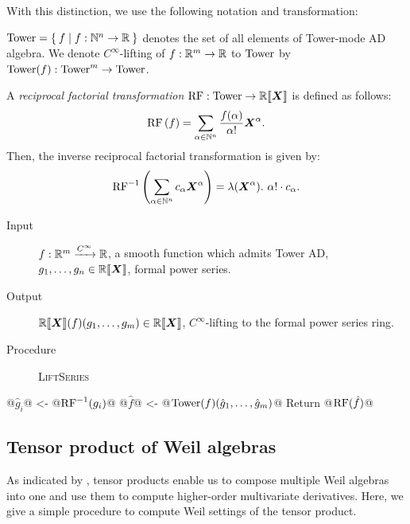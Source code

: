 With this distinction, we use the following notation and transformation:

\begin{definition}
  $\mathord{\mathrm{Tower}} = \Set{f | f: \mathbb{N}^n \to \mathbb{R}}$ denotes the set of all elements of Tower-mode AD algebra.
  We denote $C^\infty$-lifting of $f: \mathbb{R}^m \to \mathbb{R}$ to $\mathord{\mathrm{Tower}}$ by $\mathord{\mathrm{Tower}}(f): \mathord{\mathrm{Tower}}^m \to \mathord{\mathrm{Tower}}$.

  A \emph{reciprocal factorial transformation} $\operatorname{RF}: \mathord{\mathrm{Tower}} \to \mathord{\mathbb{R}\llbracket\boldsymbol{X}\rrbracket}$ is defined as follows:
  \[
    \operatorname{RF}\left(f\right)
    = \sum_{\alpha \in \mathbb{N}^n} \frac{f(\alpha)}{\alpha!} \boldsymbol{X}^\alpha.
  \]
  Then, the inverse reciprocal factorial transformation is given by:
  \[
  \operatorname{RF}^{-1}\left(\sum_{\alpha \in \mathbb{N}^n} c_\alpha \boldsymbol{X}^\alpha\right)
  = \lambda (\boldsymbol{X}^\alpha).\ \alpha ! \cdot c_\alpha.
  \]
\end{definition}

\begin{algorithm}\label{lift-series}
\hfill\vspace{-.25em}
\begin{description}
  \item[Input]
    $f: \mathbb{R}^m \xrightarrow{C^\infty} \mathbb{R}$, a smooth function which admits Tower AD,
    $g_1, \dots, g_n \in \mathord{\mathbb{R}\llbracket\boldsymbol{X}\rrbracket}$, formal power series.
  \item[Output] $\mathord{\mathbb{R}\llbracket\boldsymbol{X}\rrbracket}(f)(g_1, \dots, g_m) \in \mathord{\mathbb{R}\llbracket\boldsymbol{X}\rrbracket}$, $C^\infty$-lifting to the formal power series ring.
  \item[Procedure] \textup{\textsc{LiftSeries}}
\end{description}
\begin{alg}
@$\hat{g}_i$@ <- @$\operatorname{RF}^{-1}(g_i)$@
@$\hat{f}$@ <- @$\mathord{\mathrm{Tower}}(f)(\hat{g}_1, \dots, \hat{g}_m)$@
Return @$\operatorname{RF}(\hat{f})$@
\end{alg}
\end{algorithm}

\subsection{Tensor product of Weil algebras}
\label{sec:tensor-algorithm}
As indicated by , tensor products enable us to compose multiple Weil algebras into one and use them to compute higher-order multivariate derivatives.
Here, we give a simple procedure to compute Weil settings of the tensor product.

